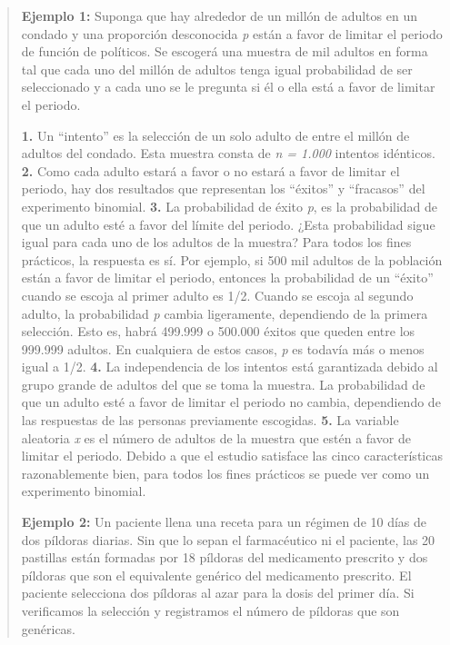 \documentclass[]{article}
\begin{document}
 \begin{quote}
 	\textbf{Ejemplo 1:} Suponga que hay alrededor de un millón de adultos en un condado y una proporción desconocida \textit{p} están a favor de limitar el periodo de función de políticos. Se escogerá una muestra de mil adultos en forma tal que cada uno del millón de adultos tenga igual probabilidad de ser seleccionado y a cada uno se le pregunta si él o ella está a favor de limitar el periodo.
 	\item \textbf{1.} Un “intento” es la selección de un solo adulto de entre el millón de adultos del condado. Esta muestra consta de \textit{n = 1.000} intentos idénticos. \newline
 	\textbf{2.} Como cada adulto estará a favor o no estará a favor de limitar el periodo, hay dos resultados que representan los “éxitos” y “fracasos” del experimento binomial. \newline
 	\textbf{3.} La probabilidad de éxito \textit{p}, es la probabilidad de que un adulto esté a favor del límite del periodo. ¿Esta probabilidad sigue igual para cada uno de los adultos de la muestra? Para todos los fines prácticos, la respuesta es sí. Por ejemplo, si 500 mil adultos de la población están a favor de limitar el periodo, entonces la probabilidad de un “éxito” cuando se escoja al primer adulto es 1/2. Cuando se escoja al segundo adulto, la probabilidad \textit{p} cambia ligeramente, dependiendo de la primera selección. Esto es, habrá 499.999 o 500.000 éxitos que queden entre los 999.999 adultos. En cualquiera de estos casos, \textit{p} es todavía más o menos igual a 1/2.
 	\textbf{4.} La independencia de los intentos está garantizada debido al grupo grande de adultos del que se toma la muestra. La probabilidad de que un adulto esté a favor de limitar el periodo no cambia, dependiendo de las respuestas de las personas previamente escogidas. \newline
 	\textbf{5.} La variable aleatoria \textit{x} es el número de adultos de la muestra que estén a favor de limitar el periodo.
 	Debido a que el estudio satisface las cinco características razonablemente bien, para todos los fines prácticos se puede ver como un experimento binomial.
 	\item \textbf{Ejemplo 2:} Un paciente llena una receta para un régimen de 10 días de dos píldoras diarias. Sin que lo sepan el farmacéutico ni el paciente, las 20 pastillas están formadas por 18 píldoras del medicamento prescrito y dos píldoras que son el equivalente genérico del medicamento prescrito. El paciente selecciona dos píldoras al azar para la dosis del primer día. Si verificamos la selección y registramos el número de píldoras que son genéricas. \newline

\end{quote}
\end{document}
